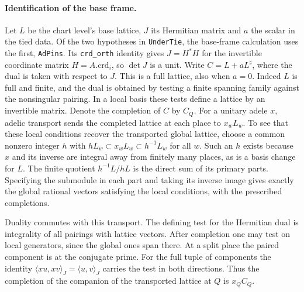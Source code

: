 \paragraph{Identification of the base frame.}
Let $L$ be the chart level's base lattice, $J$ its Hermitian matrix and
$a$ the scalar in the tied data. Of the two hypotheses in \nolinkurl{UnderTie},
the base-frame calculation uses the first, \nolinkurl{AdPins}. Its
\nolinkurl{crd_orth} identity gives $J=H^*H$ for the invertible coordinate
matrix $H=A.\mathrm{crd}_i$, so $\det J$ is a unit. Write
$C=L+aL^{\sharp}$, where the dual is taken with respect to $J$.
This is a full lattice, also when $a=0$. Indeed $L$ is full and finite,
and the dual is obtained by testing a finite spanning family against the
nonsingular pairing. In a local basis these tests define a lattice by
an invertible matrix. Denote the completion of $C$ by $C_Q$.
For a unitary adele $x$, adelic transport sends the completed lattice at
each place to $x_wL_w$. To see that these local conditions recover the
transported global lattice, choose a common nonzero integer $h$ with
$hL_w\subset x_wL_w\subset h^{-1}L_w$ for all $w$. Such an $h$ exists
because $x$ and its inverse are integral away from finitely many places,
as is a basis change for $L$. The finite quotient $h^{-1}L/hL$ is the
direct sum of its primary parts. Specifying the submodule in each part
and taking its inverse image gives exactly the global rational vectors
satisfying the local conditions, with the prescribed completions.

Duality commutes with this transport. The defining test for the
Hermitian dual is integrality of all pairings with lattice vectors.
After completion one may test on local generators, since the global
ones span there. At a split place the paired component is at the
conjugate prime. For the full tuple of components the identity
$\langle xu,xv\rangle_J=\langle u,v\rangle_J$ carries the test in both
directions. Thus the completion of the companion of the transported
lattice at $Q$ is $x_Q C_Q$.

